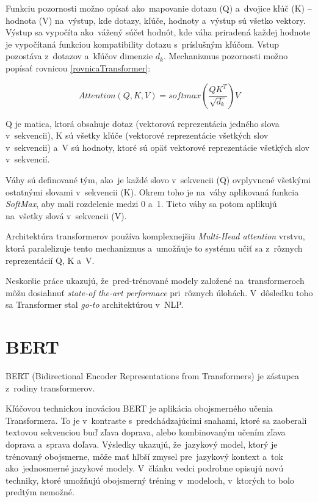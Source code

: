 Funkciu pozornosti možno opísať ako~mapovanie dotazu (Q) a~dvojice kľúč (K) – hodnota (V) na~výstup, kde dotazy, kľúče, hodnoty a~výstup sú všetko vektory. Výstup sa vypočíta ako~vážený súčet hodnôt, kde váha priradená každej hodnote je vypočítaná funkciou kompatibility dotazu s~príslušným kľúčom. Vstup pozostáva z~dotazov a~kľúčov dimenzie \(d_{k}\).
Mechanizmus pozornosti možno popísať rovnicou \eqref{rovnicaTransformer}: 

\begin{equation}
	Attention(Q, K, V)=  softmax(\dfrac{QK^{T}}{\sqrt{d_{k}}})V \label{rovnicaTransformer}
\end{equation}

Q je matica, ktorá obsahuje dotaz (vektorová reprezentácia jedného slova v~sekvencii), K sú všetky kľúče (vektorové reprezentácie všetkých slov v~sekvencii) a~V sú hodnoty, ktoré sú opäť vektorové reprezentácie všetkých slov v~sekvencií.

Váhy sú definované tým, ako~je každé slovo v~sekvencii (Q) ovplyvnené všetkými ostatnými slovami v~sekvencii (K). Okrem toho je na~váhy aplikovaná funkcia \textit{SoftMax}, aby mali rozdelenie medzi 0 a~1. Tieto váhy sa potom aplikujú na~všetky slová v~sekvencii (V).

Architektúra transformerov používa komplexnejšiu \textit{Multi-Head attention} vrstvu, ktorá paralelizuje tento mechanizmus a~umožňuje to systému učiť sa z~rôznych reprezentácií Q, K a~V. 

Neskoršie práce ukazujú, že~pred-trénované modely založené na~transformeroch môžu dosiahnuť \textit{state-of the-art performace} pri~rôznych úlohách. V~dôsledku toho sa Transformer stal \textit{go-to} architektúrou v~NLP. \cite{Tianyang:2021} \cite{Allard:2019}

\section{BERT} \label{bert}

BERT \cite{Devlin:2018} (Bidirectional Encoder Representations from Transformers) je
zástupca z~rodiny transformerov. 

Kľúčovou technickou inováciou BERT je aplikácia obojsmerného učenia Transformera. To je v~kontraste s~predchádzajúcimi snahami, ktoré sa zaoberali textovou sekvenciou buď zľava doprava, alebo kombinovaným učením zľava doprava a~sprava doľava. Výsledky ukazujú, že~jazykový model, ktorý je trénovaný obojsmerne, môže mať hlbší zmysel pre~jazykový kontext a~tok ako~jednosmerné jazykové modely. V~článku vedci podrobne opisujú novú techniky, ktoré umožňujú obojsmerný tréning v~modeloch, v~ktorých to bolo predtým nemožné.

